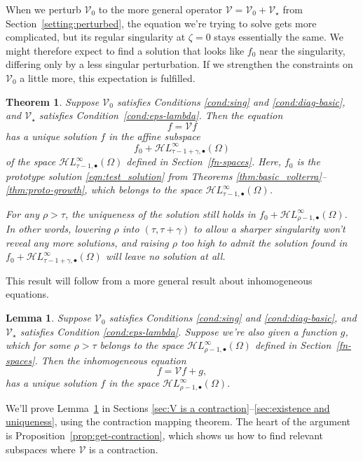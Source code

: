\documentclass{article}
\theoremstyle{plain}
\newtheorem{lemma}{Lemma}
\newtheorem{thm}{Theorem}
\newcommand{\singexp}[2]{\mathcal{H}L^\infty_{#1, #2}}
\newcommand{\singexpalg}[1]{\singexp{#1}{\bullet}}
\newcommand{\volterra}{\mathcal{V}}
\newcommand{\hardpart}{\mathcal{V}_0}
\newcommand{\softpart}{\mathcal{V}_\star}
\newcommand{\solproto}{f_0}
\newcommand{\domain}{\Omega}
\begin{document}
When we perturb $\hardpart$ to the more general operator $\volterra = \hardpart + \softpart$ from Section~\ref{setting:perturbed}, the equation we're trying to solve gets more complicated, but its regular singularity at $\zeta = 0$ stays essentially the same. We might therefore expect to find a solution that looks like $\solproto$ near the singularity, differing only by a less singular perturbation. If we strengthen the constraints on $\hardpart$ a little more, this expectation is fulfilled.
\begin{thm}\label{thm:general_volterra}
Suppose $\hardpart$ satisfies {\em Conditions \eqref{cond:sing}} and \eqref{cond:diag-basic}, and $\softpart$ satisfies {\em Condition~\eqref{cond:eps-lambda}}. Then the equation
\[f = \volterra f\]
has a unique solution $f$ in the affine subspace
\[ f_0 + \singexpalg{\tau-1+\gamma}(\Omega) \]
of the space $\singexpalg{\tau-1}(\Omega)$ defined in Section~\ref{fn-spaces}. Here, $f_0$ is the prototype solution \eqref{eqn:test_solution} from Theorems \ref{thm:basic_volterra}--\ref{thm:proto-growth}, which belongs to the space $\singexpalg{\tau-1}(\domain)$.

For any $\rho > \tau$, the uniqueness of the solution still holds in $f_0 + \singexpalg{\rho-1}(\Omega)$. In other words, lowering $\rho$ into $(\tau, \tau+\gamma)$ to allow a sharper singularity won't reveal any more solutions, and raising $\rho$ too high to admit the solution found in $f_0 + \singexpalg{\tau-1+\gamma}(\Omega)$ will leave no solution at all.
\end{thm}
This result will follow from a more general result about inhomogeneous equations.
\begin{lemma}\label{lem:perturbed_volterra}
Suppose $\hardpart$ satisfies {\em Conditions \eqref{cond:sing}} and \eqref{cond:diag-basic}, and $\softpart$ satisfies {\em Condition \eqref{cond:eps-lambda}}. Suppose we're also given a function $g$, which for some $\rho > \tau$ belongs to the space $\singexpalg{\rho-1}(\Omega)$ defined in Section~\ref{fn-spaces}. Then the inhomogeneous equation
\[ f = \volterra f + g, \]
has a unique solution $f$ in the space $\singexpalg{\rho-1}(\Omega)$.
\end{lemma}
We'll prove Lemma~\ref{lem:perturbed_volterra} in Sections \ref{sec:V is a contraction}--\ref{sec:existence and uniqueness}, using the contraction mapping theorem. The heart of the argument is Proposition~\ref{prop:get-contraction}, which shows us how to find relevant subspaces where $\volterra$ is a contraction.
\end{document}
